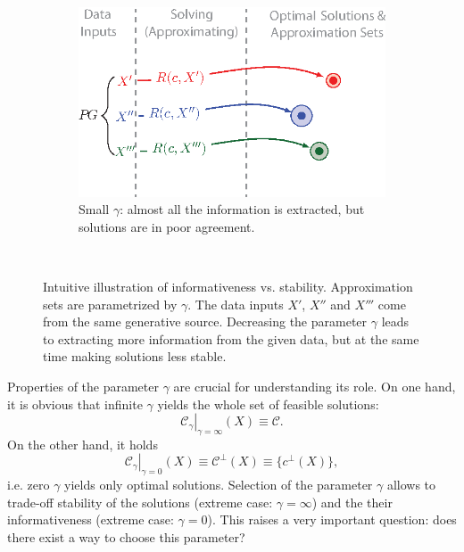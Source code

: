 \begin{figure}[th!]
\begin{subfigure}[b]{.48\textwidth}
        \end{subfigure}
        \\[.5cm]
        \begin{subfigure}[b]{.48\textwidth}
            \includegraphics[width=\linewidth]{figures/ch_generic_approach/asc_coding_approximation_4}
            \caption{Small $\gamma$: almost all the information is extracted, but solutions are in poor agreement.}
            \label{fig:asc_illustration-3}
        \end{subfigure}
        \\[.5cm]
        \caption{Intuitive illustration of informativeness vs. stability.
          Approximation sets are parametrized by $\gamma$. The data inputs $X'$,
          $X''$ and $X'''$ come from the same generative source. Decreasing the
          parameter $\gamma$ leads to extracting more information from the given
          data, but at the same time making solutions less stable.}
        \label{fig:asc_illustration}
\end{figure}

Properties of the parameter $\gamma$ are crucial for understanding its role.
On one hand, it is obvious that infinite $\gamma$ yields the whole set of
feasible solutions:
\[
    \left.\mathcal{C}_{\gamma} \right|_{\gamma = \infty} (X) 
      \equiv \mathcal{C}.
\]
On the other hand, it holds
\[
    \left.\mathcal{C}_{\gamma} \right|_{\gamma = 0} (X) 
      \equiv \mathcal{C}^\bot(X) 
      \equiv \{c^\bot(X)\},
\]
i.e. zero $\gamma$ yields only optimal solutions. Selection of the parameter
$\gamma$ allows to trade-off stability of the solutions (extreme case: $\gamma =
\infty$) and the their informativeness (extreme case: $\gamma = 0$). This raises
a very important question: does there exist a way to choose this parameter?

